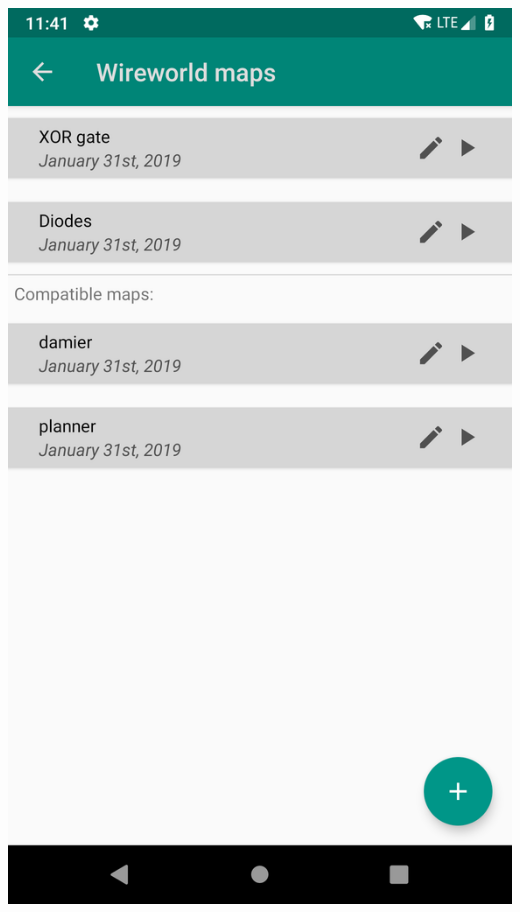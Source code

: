 \documentclass{report}
\begin{document}
\begin{minipage}{.45\textwidth}
\begin{minipage}{.45\linewidth}
    \includegraphics[width=\linewidth]{screens/maps.png}
  \end{minipage}\hfill
\end{minipage} \hfill
\end{document}
